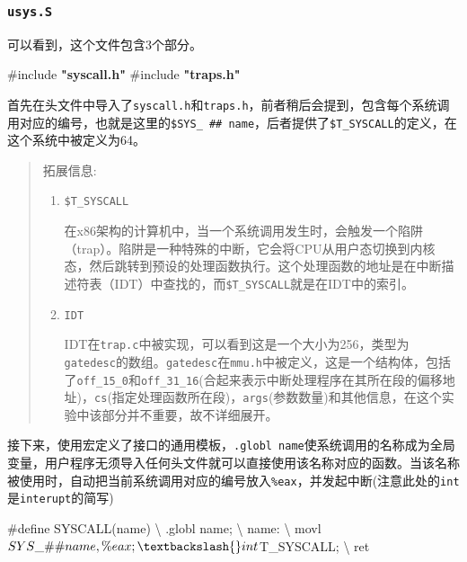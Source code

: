 \documentclass[
]{article}
\newenvironment{Shaded}{}{}
\newcommand{\ImportTok}[1]{\textcolor[rgb]{0.00,0.50,0.00}{\textbf{#1}}}
\newcommand{\NormalTok}[1]{#1}
\newcommand{\PreprocessorTok}[1]{\textcolor[rgb]{0.74,0.48,0.00}{#1}}
\begin{document}
\subsubsection{\texorpdfstring{\texttt{usys.S}}{usys.S}}\label{usyss}

可以看到，这个文件包含3个部分。

\begin{Shaded}
  \begin{Highlighting}[]
    \PreprocessorTok{\#include }\ImportTok{"syscall.h"}
    \PreprocessorTok{\#include }\ImportTok{"traps.h"}
  \end{Highlighting}
\end{Shaded}

首先在头文件中导入了\texttt{syscall.h}和\texttt{traps.h}，前者稍后会提到，包含每个系统调用对应的编号，也就是这里的\texttt{\$SYS\_\ \#\#\ name}，后者提供了\texttt{\$T\_SYSCALL}的定义，在这个系统中被定义为64。

\begin{quote}
  拓展信息:

  \begin{enumerate}
    \def\labelenumi{\arabic{enumi}.}
    \item
          \texttt{\$T\_SYSCALL}

          在x86架构的计算机中，当一个系统调用发生时，会触发一个陷阱（trap）。陷阱是一种特殊的中断，它会将CPU从用户态切换到内核态，然后跳转到预设的处理函数执行。这个处理函数的地址是在中断描述符表（IDT）中查找的，而\texttt{\$T\_SYSCALL}就是在IDT中的索引。
    \item
          \texttt{IDT}

          IDT在\texttt{trap.c}中被实现，可以看到这是一个大小为256，类型为\texttt{gatedesc}的数组。\texttt{gatedesc}在\texttt{mmu.h}中被定义，这是一个结构体，包括了\texttt{off\_15\_0}和\texttt{off\_31\_16}(合起来表示中断处理程序在其所在段的偏移地址)，\texttt{cs}(指定处理函数所在段)，\texttt{args}(参数数量)和其他信息，在这个实验中该部分并不重要，故不详细展开。
  \end{enumerate}
\end{quote}

接下来，使用宏定义了接口的通用模板，\texttt{.globl\ name}使系统调用的名称成为全局变量，用户程序无须导入任何头文件就可以直接使用该名称对应的函数。当该名称被使用时，自动把当前系统调用对应的编号放入\texttt{\%eax}，并发起中断(注意此处的\texttt{int}是\texttt{interupt}的简写)

\begin{Shaded}
  \begin{Highlighting}[]
    \NormalTok{\#define SYSCALL(name) \textbackslash{}}
    \NormalTok{  .globl name; \textbackslash{}}
    \NormalTok{  name: \textbackslash{}}
    \NormalTok{    movl $SYS\_ \#\# name, \%eax; \textbackslash{}}
    \NormalTok{    int $T\_SYSCALL; \textbackslash{}}
    \NormalTok{    ret}
  \end{Highlighting}
\end{Shaded}
\end{document}
